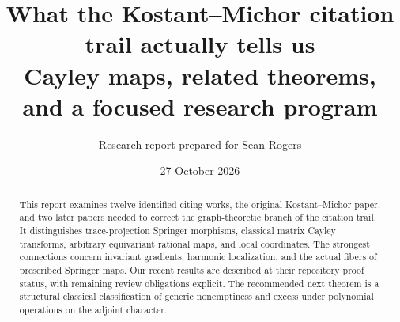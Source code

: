 \documentclass[11pt,letterpaper]{article}
\title{What the Kostant--Michor citation trail actually tells us\\[5pt]\large Cayley maps, related theorems, and a focused research program}
\author{Research report prepared for Sean Rogers}\date{27 October 2026}
\begin{document}
\maketitle
\begin{abstract}
This report examines twelve identified citing works, the original Kostant--Michor paper, and two later papers needed to correct the graph-theoretic branch of the citation trail. It distinguishes trace-projection Springer morphisms, classical matrix Cayley transforms, arbitrary equivariant rational maps, and local coordinates. The strongest connections concern invariant gradients, harmonic localization, and the actual fibers of prescribed Springer maps. Our recent results are described at their repository proof status, with remaining review obligations explicit. The recommended next theorem is a structural classical classification of generic nonemptiness and excess under polynomial operations on the adjoint character.
\end{abstract}
\end{document}
